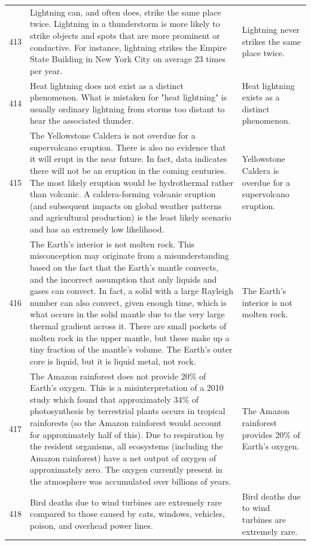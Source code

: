 \begin{tabular}{c|p{}|p{}}
413 & Lightning can, and often does, strike the same place twice. Lightning in a thunderstorm is more likely to strike objects and spots that are more prominent or conductive. For instance, lightning strikes the Empire State Building in New York City on average 23 times per year. & Lightning never strikes the same place twice. \\
414 & Heat lightning does not exist as a distinct phenomenon. What is mistaken for "heat lightning" is usually ordinary lightning from storms too distant to hear the associated thunder. & Heat lightning exists as a distinct phenomenon. \\
415 & The Yellowstone Caldera is not overdue for a supervolcano eruption. There is also no evidence that it will erupt in the near future. In fact, data indicates there will not be an eruption in the coming centuries. The most likely eruption would be hydrothermal rather than volcanic. A caldera-forming volcanic eruption (and subsequent impacts on global weather patterns and agricultural production) is the least likely scenario and has an extremely low likelihood. & Yellowstone Caldera is overdue for a supervolcano eruption. \\
416 & The Earth's interior is not molten rock. This misconception may originate from a misunderstanding based on the fact that the Earth's mantle convects, and the incorrect assumption that only liquids and gases can convect. In fact, a solid with a large Rayleigh number can also convect, given enough time, which is what occurs in the solid mantle due to the very large thermal gradient across it. There are small pockets of molten rock in the upper mantle, but these make up a tiny fraction of the mantle's volume. The Earth's outer core is liquid, but it is liquid metal, not rock. & The Earth's interior is not molten rock. \\
417 & The Amazon rainforest does not provide 20\% of Earth's oxygen. This is a misinterpretation of a 2010 study which found that approximately 34\% of photosynthesis by terrestrial plants occurs in tropical rainforests (so the Amazon rainforest would account for approximately half of this). Due to respiration by the resident organisms, all ecosystems (including the Amazon rainforest) have a net output of oxygen of approximately zero. The oxygen currently present in the atmosphere was accumulated over billions of years. & The Amazon rainforest provides 20\% of Earth's oxygen. \\
418 & Bird deaths due to wind turbines are extremely rare compared to those caused by cats, windows, vehicles, poison, and overhead power lines. & Bird deaths due to wind turbines are extremely rare. \\

\end{tabular}
